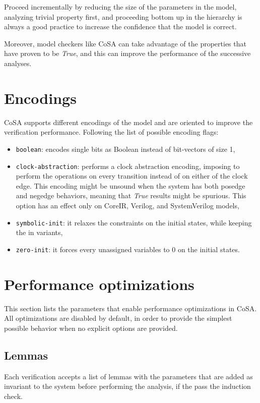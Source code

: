 \documentclass{article}
\theoremstyle{definition}
\begin{document}
\begin{itemize}
  Proceed incrementally by reducing the size of the parameters in the
  model, analyzing trivial property first, and proceeding bottom up in
  the hierarchy is always a good practice to increase the confidence
  that the model is correct.

  Moreover, model checkers like CoSA can take advantage of the
  properties that have proven to be \emph{True}, and this can improve
  the performance of the successive analyses.
\end{itemize}
  


\section{Encodings}
\label{sec:encodings}

CoSA supports different encodings of the model and are oriented to
improve the verification performance. Following the list of possible
encoding flags:

\begin{itemize}
\item \texttt{boolean}: encodes single bits as Boolean instead of
  bit-vectors of size 1,
\item \texttt{clock-abstraction}: performs a clock abstraction
  encoding, imposing to perform the operations on every transition
  instead of on either of the clock edge. This encoding might be
  unsound when the system has both posedge and negedge behaviors,
  meaning that \emph{True} results might be spurious. This option has
  an effect only on CoreIR, Verilog, and SystemVerilog models,
\item \texttt{symbolic-init}: it relaxes the constraints on the
  initial states, while keeping the in variants,
\item \texttt{zero-init}: it forces every unassigned variables to 0 on
  the initial states.
\end{itemize}


\section{Performance optimizations}
\label{sec:optimizations}

This section lists the parameters that enable performance
optimizations in CoSA. All optimizations are disabled by default, in
order to provide the simplest possible behavior when no explicit
options are provided.

\subsection{Lemmas}
Each verification accepts a list of lemmas with the parameters that
are added as invariant to the system before performing the analysis,
if the pass the induction check.
\end{document}
